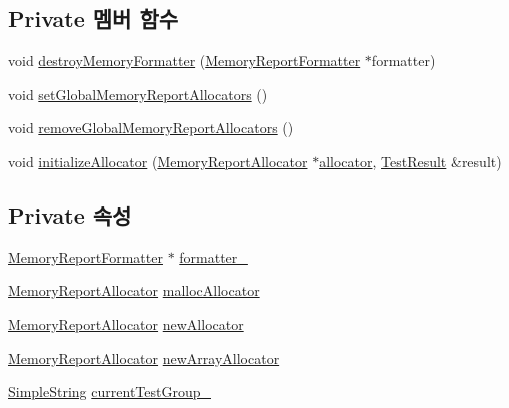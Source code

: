 \subsection*{Private 멤버 함수}
\begin{DoxyCompactItemize}
\item 
void \hyperlink{class_memory_reporter_plugin_a9e2f7802bc815dd0019857f26c5996a6}{destroy\+Memory\+Formatter} (\hyperlink{class_memory_report_formatter}{Memory\+Report\+Formatter} $\ast$formatter)
\item 
void \hyperlink{class_memory_reporter_plugin_ad370cc906e33aa1c0d154a801821f0e3}{set\+Global\+Memory\+Report\+Allocators} ()
\item 
void \hyperlink{class_memory_reporter_plugin_ad599e1a65e36647a13aaccacace96328}{remove\+Global\+Memory\+Report\+Allocators} ()
\item 
void \hyperlink{class_memory_reporter_plugin_a4fb1e05cb45f4311847a1275fc20188f}{initialize\+Allocator} (\hyperlink{class_memory_report_allocator}{Memory\+Report\+Allocator} $\ast$\hyperlink{_memory_leak_warning_test_8cpp_a83fc2e9b9142613f7df2bcc3ff8292bc}{allocator}, \hyperlink{class_test_result}{Test\+Result} \&result)
\end{DoxyCompactItemize}
\subsection*{Private 속성}
\begin{DoxyCompactItemize}
\item 
\hyperlink{class_memory_report_formatter}{Memory\+Report\+Formatter} $\ast$ \hyperlink{class_memory_reporter_plugin_a09aec3af9ca6c3c27226a1aaaea13987}{formatter\+\_\+}
\item 
\hyperlink{class_memory_report_allocator}{Memory\+Report\+Allocator} \hyperlink{class_memory_reporter_plugin_aa49eebf4ef7d746fe9b0bd9d4f531a26}{malloc\+Allocator}
\item 
\hyperlink{class_memory_report_allocator}{Memory\+Report\+Allocator} \hyperlink{class_memory_reporter_plugin_a16c3ef79a69a69085afcf09a45204886}{new\+Allocator}
\item 
\hyperlink{class_memory_report_allocator}{Memory\+Report\+Allocator} \hyperlink{class_memory_reporter_plugin_a3d542a63f3f729d8721651311e8a7eae}{new\+Array\+Allocator}
\item 
\hyperlink{class_simple_string}{Simple\+String} \hyperlink{class_memory_reporter_plugin_a4733051c1386e53d8d11c6b35922dbc7}{current\+Test\+Group\+\_\+}
\end{DoxyCompactItemize}


